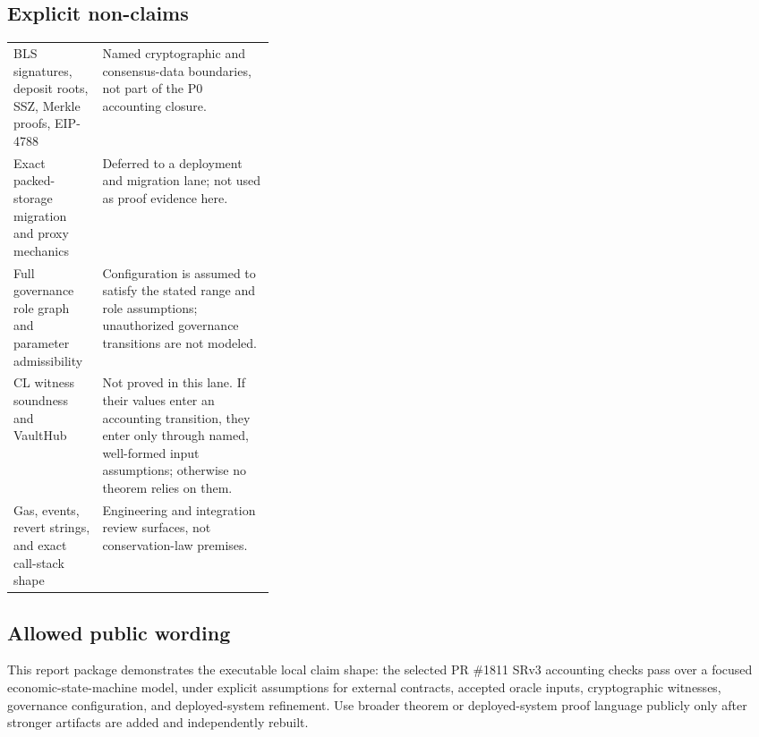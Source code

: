 \subsection*{Explicit non-claims}

\noindent
\begin{xltabular}{\linewidth}{@{}p{0.34\linewidth}>{\raggedright\arraybackslash}X@{}}
  \toprule
   &  \\
  \midrule
  \endhead
  BLS signatures, deposit roots, SSZ, Merkle proofs, EIP-4788 &
  Named cryptographic and consensus-data boundaries, not part of the P0
  accounting closure. \\
  \rowsep
  Exact packed-storage migration and proxy mechanics &
  Deferred to a deployment and migration lane; not used as proof evidence here. \\
  \rowsep
  Full governance role graph and parameter admissibility &
  Configuration is assumed to satisfy the stated range and role assumptions;
  unauthorized governance transitions are not modeled. \\
  \rowsep
  CL witness soundness and VaultHub &
  Not proved in this lane. If their values enter an accounting transition, they
  enter only through named, well-formed input assumptions; otherwise no theorem
  relies on them. \\
  \rowsep
  Gas, events, revert strings, and exact call-stack shape &
  Engineering and integration review surfaces, not conservation-law premises. \\
  \bottomrule
\end{xltabular}

\subsection*{Allowed public wording}

\begin{notebox}
This report package demonstrates the executable local claim shape: the selected
PR \#1811 SRv3 accounting checks pass over a focused economic-state-machine
model, under explicit assumptions for external contracts, accepted oracle inputs,
cryptographic witnesses, governance configuration, and deployed-system
refinement. Use broader theorem or deployed-system proof language publicly only
after stronger artifacts are added and independently rebuilt.
\end{notebox}
